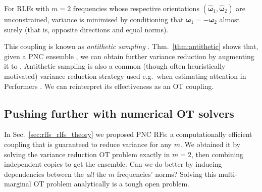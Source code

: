 \begin{theorem} \label{thm:antithetic}
    For RLFs with $m=2$  frequencies whose respective orientations $(\widehat{\boldsymbol{\omega}}_1,\widehat{\boldsymbol{\omega}}_2)$ are unconstrained, variance is minimised by conditioning that $\boldsymbol{\omega}_1 =  -\boldsymbol{\omega}_2$ almost surely (that is, opposite directions and equal norms).
\end{theorem}
This coupling is known as \emph{antithetic sampling} \citep{hammersley1956new}.
Thm.~\ref{thm:antithetic} shows that, given a PNC ensemble , we can obtain further variance reduction by augmenting it to .
Antithetic sampling is also a common (though often heuristically motivated) variance reduction strategy used e.g.~when estimating attention in Performers \citep{choromanski2020rethinking}. 
We can reinterpret its effectiveness as an OT coupling.

\subsection{Pushing further with numerical OT solvers} \label{sec:copulas}
In Sec.~\ref{sec:rffs_rlfs_theory} we proposed PNC RFs: a computationally efficient coupling that is guaranteed to reduce variance for any $m$. 
We obtained it by solving the variance reduction OT problem exactly in $m=2$, then combining  independent copies to get the ensemble. 
Can we do better by inducing dependencies between the \emph{all} the $m$ frequencies' norms? 
Solving this multi-marginal OT problem analytically is a tough open problem.


